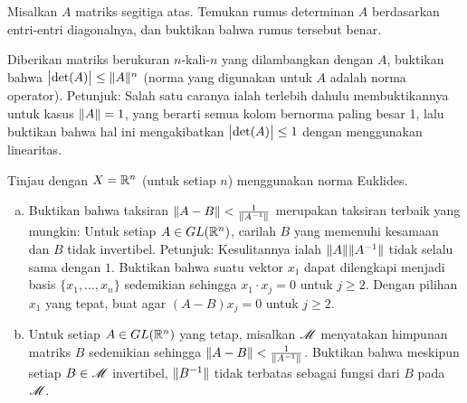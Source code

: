 \begin{exercise}
Misalkan $A$ matriks segitiga atas.  Temukan rumus determinan
$A$ berdasarkan entri-entri diagonalnya, dan buktikan bahwa rumus tersebut benar.
\end{exercise}

\begin{exercise}
Diberikan matriks berukuran $n$-kali-$n$ yang dilambangkan dengan $A$, buktikan bahwa
$\bigl\lvert {\det(A)} \bigr\rvert \leq \lVert {A} \rVert^n$ (norma yang digunakan untuk $A$ adalah norma operator).
Petunjuk: Salah satu caranya ialah terlebih dahulu membuktikannya untuk kasus $\lVert {A} \rVert=1$, yang
berarti semua kolom bernorma paling besar 1, lalu buktikan bahwa hal ini mengakibatkan
$\bigl\lvert {\det(A)} \bigr\rvert \leq 1$ dengan menggunakan linearitas.
\end{exercise}

\begin{exercise}
Tinjau 
dengan $X={\mathbb{R}}^n$ (untuk setiap $n$) menggunakan norma Euklides.
\begin{enumerate}[a)]
\item
Buktikan bahwa taksiran $\lVert {A-B} \rVert < \frac{1}{\lVert {A^{-1}} \rVert}$ merupakan
taksiran terbaik yang mungkin:
Untuk setiap 
$A \in GL({\mathbb{R}}^n)$,
carilah $B$ yang memenuhi kesamaan dan $B$ tidak invertibel.
Petunjuk:
Kesulitannya ialah $\lVert {A} \rVert\lVert {A^{-1}} \rVert$ tidak selalu sama dengan $1$.
Buktikan bahwa suatu vektor $x_1$ dapat dilengkapi menjadi basis
$\{ x_1,\ldots,x_n \}$ sedemikian sehingga $x_1 \cdot x_j = 0$ untuk $j \geq 2$.
Dengan pilihan $x_1$ yang tepat,
buat agar $(A-B)x_j = 0$ untuk $j \geq 2$.
\item
Untuk setiap $A \in GL({\mathbb{R}}^n)$ yang tetap,
misalkan ${\mathscr{M}}$ menyatakan himpunan matriks
$B$ sedemikian sehingga
$\lVert {A-B} \rVert < \frac{1}{\lVert {A^{-1}} \rVert}$.
Buktikan bahwa meskipun setiap $B \in {\mathscr{M}}$ 
invertibel, $\lVert {B^{-1}} \rVert$ tidak terbatas
sebagai fungsi dari $B$ pada ${\mathscr{M}}$.
\end{enumerate}
\end{exercise}

